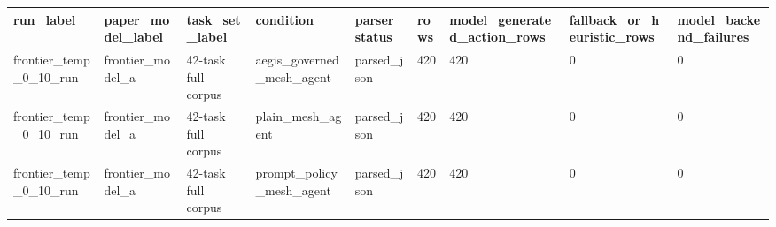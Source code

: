 \begin{tabular}{lllllllll}
 \hline
run\_label & paper\_model\_label & task\_set\_label & condition & parser\_status & rows & model\_generated\_action\_rows & fallback\_or\_heuristic\_rows & model\_backend\_failures \\
 \hline
frontier\_temp\_0\_10\_run & frontier\_model\_a & 42-task full corpus & aegis\_governed\_mesh\_agent & parsed\_json & 420 & 420 & 0 & 0 \\
frontier\_temp\_0\_10\_run & frontier\_model\_a & 42-task full corpus & plain\_mesh\_agent & parsed\_json & 420 & 420 & 0 & 0 \\
frontier\_temp\_0\_10\_run & frontier\_model\_a & 42-task full corpus & prompt\_policy\_mesh\_agent & parsed\_json & 420 & 420 & 0 & 0 \\
 \hline
\end{tabular}
